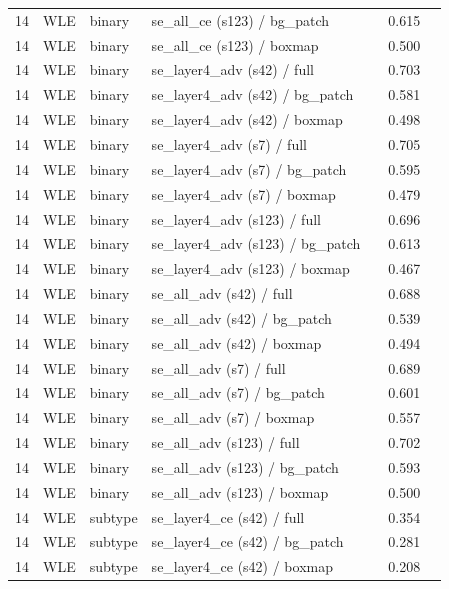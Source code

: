 \begin{longtable}{cL{1.1cm}L{1.5cm}L{5.6cm}ccc}
14 & WLE & binary & se\_all\_ce (s123) / bg\_patch & \nl{} & 0.615 & \nl{} \\
14 & WLE & binary & se\_all\_ce (s123) / boxmap & \nl{} & 0.500 & \nl{} \\
14 & WLE & binary & se\_layer4\_adv (s42) / full & \nl{} & 0.703 & \nl{} \\
14 & WLE & binary & se\_layer4\_adv (s42) / bg\_patch & \nl{} & 0.581 & \nl{} \\
14 & WLE & binary & se\_layer4\_adv (s42) / boxmap & \nl{} & 0.498 & \nl{} \\
14 & WLE & binary & se\_layer4\_adv (s7) / full & \nl{} & 0.705 & \nl{} \\
14 & WLE & binary & se\_layer4\_adv (s7) / bg\_patch & \nl{} & 0.595 & \nl{} \\
14 & WLE & binary & se\_layer4\_adv (s7) / boxmap & \nl{} & 0.479 & \nl{} \\
14 & WLE & binary & se\_layer4\_adv (s123) / full & \nl{} & 0.696 & \nl{} \\
14 & WLE & binary & se\_layer4\_adv (s123) / bg\_patch & \nl{} & 0.613 & \nl{} \\
14 & WLE & binary & se\_layer4\_adv (s123) / boxmap & \nl{} & 0.467 & \nl{} \\
14 & WLE & binary & se\_all\_adv (s42) / full & \nl{} & 0.688 & \nl{} \\
14 & WLE & binary & se\_all\_adv (s42) / bg\_patch & \nl{} & 0.539 & \nl{} \\
14 & WLE & binary & se\_all\_adv (s42) / boxmap & \nl{} & 0.494 & \nl{} \\
14 & WLE & binary & se\_all\_adv (s7) / full & \nl{} & 0.689 & \nl{} \\
14 & WLE & binary & se\_all\_adv (s7) / bg\_patch & \nl{} & 0.601 & \nl{} \\
14 & WLE & binary & se\_all\_adv (s7) / boxmap & \nl{} & 0.557 & \nl{} \\
14 & WLE & binary & se\_all\_adv (s123) / full & \nl{} & 0.702 & \nl{} \\
14 & WLE & binary & se\_all\_adv (s123) / bg\_patch & \nl{} & 0.593 & \nl{} \\
14 & WLE & binary & se\_all\_adv (s123) / boxmap & \nl{} & 0.500 & \nl{} \\
14 & WLE & subtype & se\_layer4\_ce (s42) / full & \nl{} & 0.354 & \nl{} \\
14 & WLE & subtype & se\_layer4\_ce (s42) / bg\_patch & \nl{} & 0.281 & \nl{} \\
14 & WLE & subtype & se\_layer4\_ce (s42) / boxmap & \nl{} & 0.208 & \nl{} \\

\end{longtable}
